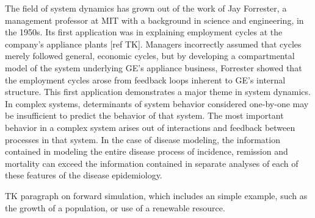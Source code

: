 The field of system dynamics has grown out of the work of Jay Forrester, a
management professor at MIT with a background in science and
engineering, in the 1950s. Its first application was in explaining
employment cycles at the company's appliance plants [ref TK]. Managers
incorrectly assumed that cycles merely followed general, economic
cycles, but by developing a compartmental model of the system
underlying GE's appliance business, Forrester showed that the
employment cycles arose from feedback loops inherent to GE's internal
structure. This first application demonstrates a major theme in system
dynamics. In complex systems, determinants of system behavior
considered one-by-one may be insufficient to predict the behavior of
that system. The most important behavior in a complex system arises
out of interactions and feedback between processes in that system. In
the case of disease modeling, the information contained in modeling
the entire disease process of incidence, remission and mortality
can exceed the information contained in separate
analyses of each of these features of the disease epidemiology.

TK paragraph on forward simulation, which includes an simple example,
such as the growth of a population, or use of a renewable resource.

